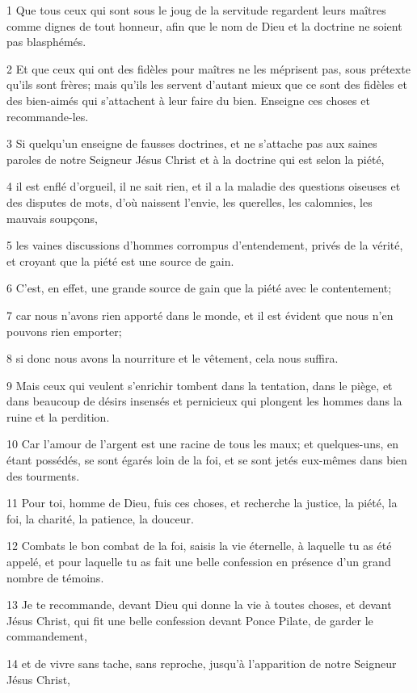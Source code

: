 \par 1 Que tous ceux qui sont sous le joug de la servitude regardent leurs maîtres comme dignes de tout honneur, afin que le nom de Dieu et la doctrine ne soient pas blasphémés.
\par 2 Et que ceux qui ont des fidèles pour maîtres ne les méprisent pas, sous prétexte qu'ils sont frères; mais qu'ils les servent d'autant mieux que ce sont des fidèles et des bien-aimés qui s'attachent à leur faire du bien. Enseigne ces choses et recommande-les.
\par 3 Si quelqu'un enseigne de fausses doctrines, et ne s'attache pas aux saines paroles de notre Seigneur Jésus Christ et à la doctrine qui est selon la piété,
\par 4 il est enflé d'orgueil, il ne sait rien, et il a la maladie des questions oiseuses et des disputes de mots, d'où naissent l'envie, les querelles, les calomnies, les mauvais soupçons,
\par 5 les vaines discussions d'hommes corrompus d'entendement, privés de la vérité, et croyant que la piété est une source de gain.
\par 6 C'est, en effet, une grande source de gain que la piété avec le contentement;
\par 7 car nous n'avons rien apporté dans le monde, et il est évident que nous n'en pouvons rien emporter;
\par 8 si donc nous avons la nourriture et le vêtement, cela nous suffira.
\par 9 Mais ceux qui veulent s'enrichir tombent dans la tentation, dans le piège, et dans beaucoup de désirs insensés et pernicieux qui plongent les hommes dans la ruine et la perdition.
\par 10 Car l'amour de l'argent est une racine de tous les maux; et quelques-uns, en étant possédés, se sont égarés loin de la foi, et se sont jetés eux-mêmes dans bien des tourments.
\par 11 Pour toi, homme de Dieu, fuis ces choses, et recherche la justice, la piété, la foi, la charité, la patience, la douceur.
\par 12 Combats le bon combat de la foi, saisis la vie éternelle, à laquelle tu as été appelé, et pour laquelle tu as fait une belle confession en présence d'un grand nombre de témoins.
\par 13 Je te recommande, devant Dieu qui donne la vie à toutes choses, et devant Jésus Christ, qui fit une belle confession devant Ponce Pilate, de garder le commandement,
\par 14 et de vivre sans tache, sans reproche, jusqu'à l'apparition de notre Seigneur Jésus Christ,
